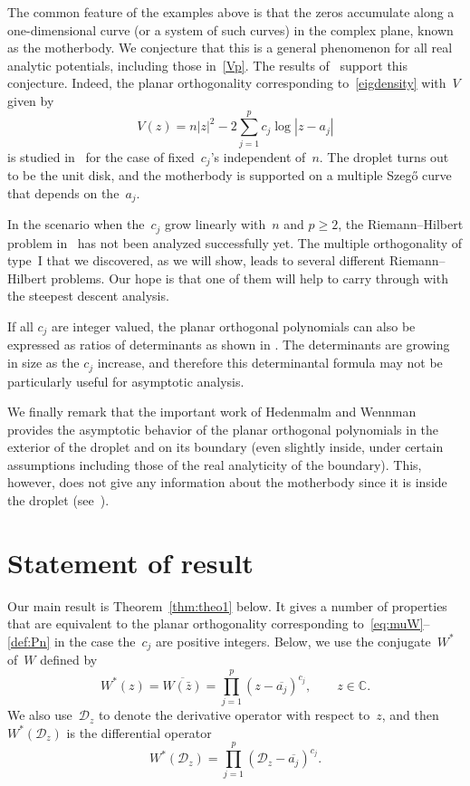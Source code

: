 \documentclass[pdftex]{sigma}
\numberwithin{equation}{section}
\newcommand*{\Cset}{\mathbb{C}} %
\begin{document}
 The common feature of the examples above is that the zeros accumulate along a one-dimensional curve
 (or a system of such curves) in the complex plane, known as the motherbody. We conjecture that this is
 a general phenomenon for all real analytic potentials, including those in~\eqref{Vp}. The
 results of~\cite{LY2, LY3} support this conjecture. Indeed, the planar orthogonality
 corresponding to~\eqref{eigdensity} with~$V$ given by
 \begin{equation*}
 V(z) = n |z|^2 - 2 \sum_{j=1}^p c_j \log |z-a_j|
 \end{equation*}
 is studied in~\cite{LY2,LY3} for the case of fixed~$c_j$'s independent of~$n$. The droplet turns out to be the unit disk, and the motherbody is supported on a multiple Szeg\H{o} curve that depends on the~$a_j$.

 In the scenario when the~$c_j$ grow linearly with~$n$ and $p \geq 2$, the Riemann--Hilbert problem in~\cite{LY3}
 has not been analyzed successfully yet. The multiple orthogonality of type~I that we discovered, as we will show,
 leads to several different Riemann--Hilbert problems. Our hope is that one of them will help to carry through with the
 steepest descent analysis.

 If all $c_j$ are integer valued, the planar orthogonal polynomials can also be
 expressed as ratios of determinants as shown in \cite{AV}. The determinants are growing in size as the
 $c_j$ increase, and therefore this determinantal formula may not be particularly useful for asymptotic analysis.

 We finally remark that the important work of Hedenmalm and Wennman~\cite{HW} provides the asymptotic behavior of the planar orthogonal polynomials in the exterior of the droplet and on its boundary (even slightly inside, under certain assumptions including those of the real analyticity of the boundary). This, however, does not give any information about the motherbody since it is inside the droplet (see~\cite[Remark 1.6\,(c)]{HW}).

 \section{Statement of result}

 Our main result is Theorem~\ref{thm:theo1} below. It gives a number of properties that are equivalent to the planar orthogonality corresponding to~\eqref{eq:muW}--\eqref{def:Pn} in the case the~$c_j$ are positive integers. Below, we use the conjugate~$W^*$ of~$W$ defined by
 \begin{equation}
 \label{eq:Wconj}
 W^*(z) = \overline{W(\bar{z})} = \prod_{j=1}^p (z-\overline{a_j})^{c_j}, \qquad z \in \Cset.
 \end{equation}
 We also use~$\mathscr{D}_z$ to denote the derivative operator with respect to~$z$, and then~$W^*(\mathscr{D}_z)$ is the differential operator
 \begin{equation}
 \label{eq:Woperator}
 W^*(\mathscr{D}_z) = \prod_{j=1}^p (\mathscr{D}_z - \overline{a_j})^{c_j}.
 \end{equation}
\end{document}
